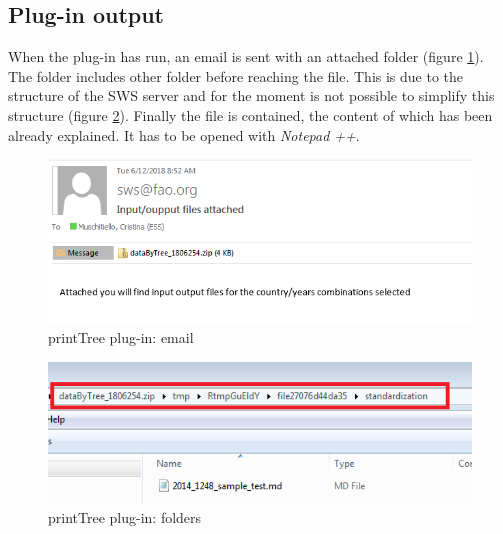 \documentclass[]{article}
\begin{document}
\subsection{Plug-in output}\label{plug-in-output}

When the plug-in has run, an email is sent with an attached folder
(figure \ref{fig:f14}). The folder includes other folder before reaching
the file. This is due to the structure of the SWS server and for the
moment is not possible to simplify this structure (figure
\ref{fig:f15}). Finally the file is contained, the content of which has
been already explained. It has to be opened with \emph{Notepad ++}.

\begin{figure}[H]

{\centering \includegraphics[width=0.8\linewidth]{images/printTree/14_messageEmail} 

}

\caption{\label{fig:f14}printTree plug-in: email}\label{fig:f14}
\end{figure}

\begin{figure}[H]

{\centering \includegraphics[width=0.8\linewidth]{images/printTree/15_emailContent} 

}

\caption{\label{fig:f15}printTree plug-in: folders}\label{fig:f15}
\end{figure}
\end{document}
